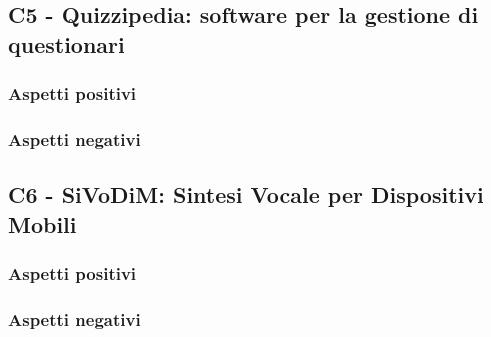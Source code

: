 \subsection{C5 - Quizzipedia: software per la gestione di questionari}
\subsubsection{Aspetti positivi}
\subsubsection{Aspetti negativi}

\subsection{C6 - SiVoDiM: Sintesi Vocale per Dispositivi Mobili}
\subsubsection{Aspetti positivi}
\subsubsection{Aspetti negativi}



